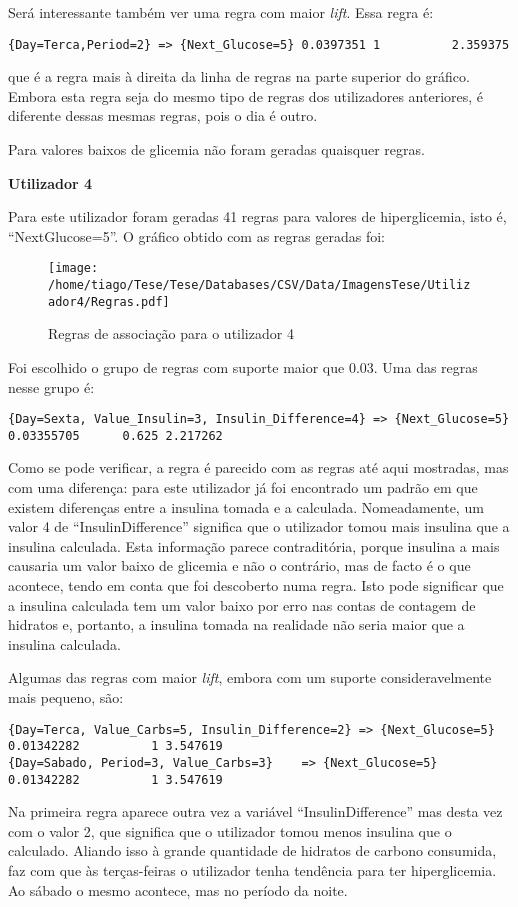 Será interessante também ver uma regra com maior \textit{lift}. Essa regra é:

\begin{lstlisting}
{Day=Terca,Period=2} => {Next_Glucose=5} 0.0397351 1          2.359375
\end{lstlisting}
que é a regra mais à direita da linha de regras na parte superior do gráfico. Embora esta regra seja do mesmo tipo de regras dos utilizadores anteriores, é diferente dessas mesmas regras, pois o dia é outro. 

Para valores baixos de glicemia não foram geradas quaisquer regras.


\textbf{Utilizador 4}

Para este utilizador foram geradas 41 regras para valores de hiperglicemia, isto é, ``Next\textunderscore Glucose=5''. O gráfico obtido com as regras geradas foi:

\begin{figure}[H]
\centering
\texttt{[image: /home/tiago/Tese/Tese/Databases/CSV/Data/ImagensTese/Utilizador4/Regras.pdf]}
\caption{Regras de associação para o utilizador 4}
\end{figure}
Foi escolhido o grupo de regras com suporte maior que 0.03. Uma das regras nesse grupo é:
 
\begin{lstlisting}
{Day=Sexta, Value_Insulin=3, Insulin_Difference=4} => {Next_Glucose=5} 0.03355705      0.625 2.217262
\end{lstlisting}
Como se pode verificar, a regra é parecido com as regras até aqui mostradas, mas com uma diferença: para este utilizador já foi encontrado um padrão em que existem diferenças entre a insulina tomada e a calculada. Nomeadamente, um valor 4 de ``Insulin\textunderscore Difference'' significa que o utilizador tomou mais insulina que a insulina calculada. Esta informação parece contraditória, porque insulina a mais causaria um valor baixo de glicemia e não o contrário, mas de facto é o que acontece, tendo em conta que foi descoberto numa regra. Isto pode significar que a insulina calculada tem um valor baixo por erro nas contas de contagem de hidratos e, portanto, a insulina tomada na realidade não seria maior que a insulina calculada.

Algumas das regras com maior \textit{lift}, embora com um suporte consideravelmente mais pequeno, são:

\begin{lstlisting}
{Day=Terca, Value_Carbs=5, Insulin_Difference=2} => {Next_Glucose=5} 0.01342282          1 3.547619
{Day=Sabado, Period=3, Value_Carbs=3}    => {Next_Glucose=5} 0.01342282          1 3.547619
\end{lstlisting}
Na primeira regra aparece outra vez a variável ``Insulin\textunderscore Difference'' mas desta vez com o valor 2, que significa que o utilizador tomou menos insulina que o calculado. Aliando isso à grande quantidade de hidratos de carbono consumida, faz com que às terças-feiras o utilizador tenha tendência para ter hiperglicemia. Ao sábado o mesmo acontece, mas no período da noite.


